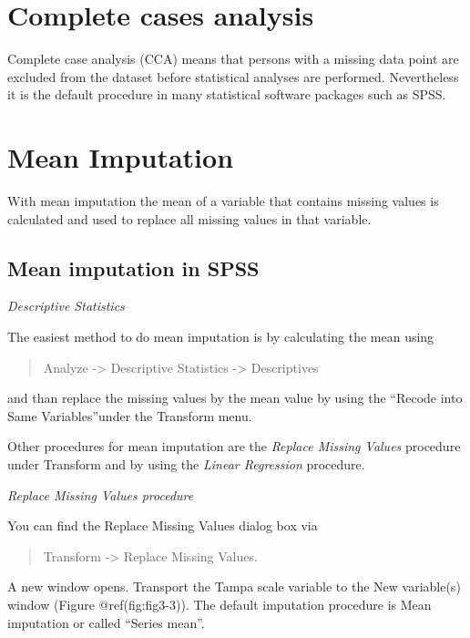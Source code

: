 \documentclass[
]{book}
\begin{document}
\hypertarget{complete-cases-analysis}{%
\section{Complete cases analysis}\label{complete-cases-analysis}}

Complete case analysis (CCA) means that persons with a missing data
point are excluded from the dataset before statistical analyses are
performed. Nevertheless it is the default procedure in many statistical
software packages such as SPSS.

\hypertarget{mean-imputation}{%
\section{Mean Imputation}\label{mean-imputation}}

With mean imputation the mean of a variable that contains missing values
is calculated and used to replace all missing values in that variable.

\hypertarget{mean-imputation-in-spss}{%
\subsection{Mean imputation in SPSS}\label{mean-imputation-in-spss}}

\emph{Descriptive Statistics}

The easiest method to do mean imputation is by calculating the mean
using

\begin{quote}
Analyze -\textgreater{} Descriptive Statistics -\textgreater{}
Descriptives
\end{quote}

and than replace the missing values by the mean value by using the
``Recode into Same Variables''under the Transform menu.

Other procedures for mean imputation are the \emph{Replace Missing
Values} procedure under Transform and by using the \emph{Linear
Regression} procedure.

\emph{Replace Missing Values procedure}

You can find the Replace Missing Values dialog box via

\begin{quote}
Transform -\textgreater{} Replace Missing Values.
\end{quote}

A new window opens. Transport the Tampa scale variable to the New
variable(s) window (Figure @ref(fig:fig3-3)). The default imputation
procedure is Mean imputation or called ``Series mean''.
\end{document}

